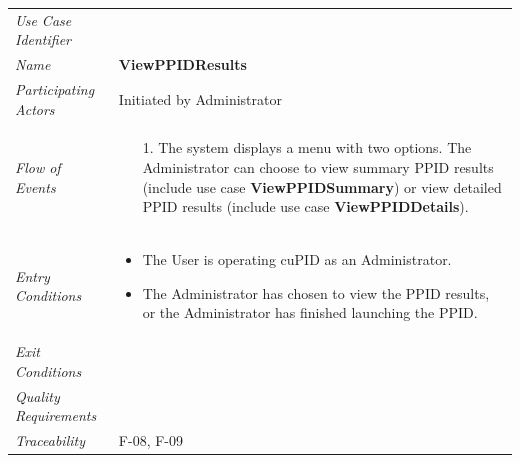 \documentclass[12pt,letterpaper]{article}
\begin{document}
\begin{center}
	\begin{tabu} to 
		\toprule
		Use Case Identifier & \viewppidresults{} \\
		Name & {\bf ViewPPIDResults} \\
		Participating Actors & Initiated by Administrator \\
		Flow of Events & 
		\begin{minipage}[t]{\linewidth}
		    \begin{enumerate}
		        \item[1.] The system displays a menu with two options. The Administrator can choose to view summary PPID results (include use case \textbf{ViewPPIDSummary}) or view detailed PPID results (include use case \textbf{ViewPPIDDetails}).
			\end{enumerate}
	    \end{minipage} \\

		Entry Conditions &
		\begin{minipage}[t]{\linewidth}
			\begin{itemize}
			    \item The User is operating cuPID as an Administrator.
			    \item The Administrator has chosen to view the PPID results, or the Administrator has finished launching the PPID.
	        \end{itemize}
	    \end{minipage} \\

		Exit Conditions & \\

		Quality Requirements & \\

		Traceability & F-08, F-09 \\
		\toprule
	\end{tabu}
\end{center}
\end{document}
